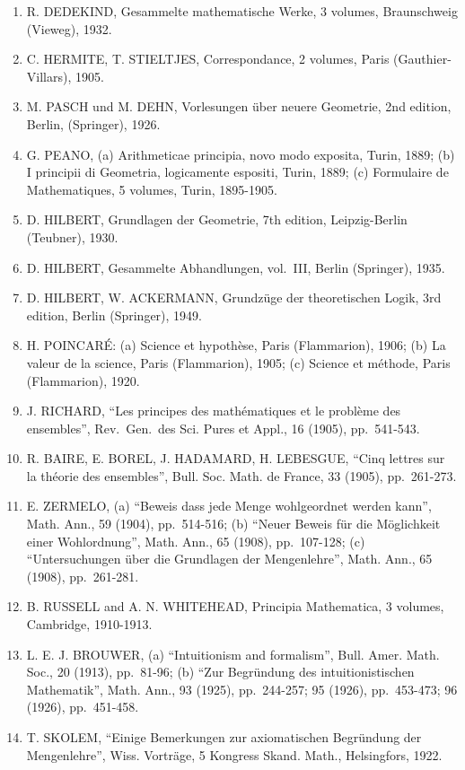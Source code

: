 \begin{enumerate}
\def\labelenumi{\arabic{enumi}.}
\setcounter{enumi}{25}
\item
  R. DEDEKIND, Gesammelte mathematische Werke, 3 volumes, Braunschweig (Vieweg), 1932.
\item
  C. HERMITE, T. STIELTJES, Correspondance, 2 volumes, Paris (Gauthier-Villars), 1905.
\item
  M. PASCH und M. DEHN, Vorlesungen über neuere Geometrie, 2nd edition, Berlin, (Springer), 1926.
\item
  G. PEANO, (a) Arithmeticae principia, novo modo exposita, Turin, 1889; (b) I principii di Geometria, logicamente espositi, Turin, 1889; (c) Formulaire de Mathematiques, 5 volumes, Turin, 1895-1905.
\item
  D. HILBERT, Grundlagen der Geometrie, 7th edition, Leipzig-Berlin (Teubner), 1930.
\item
  D. HILBERT, Gesammelte Abhandlungen, vol.~III, Berlin (Springer), 1935.
\item
  D. HILBERT, W. ACKERMANN, Grundzüge der theoretischen Logik, 3rd edition, Berlin (Springer), 1949.
\item
  H. POINCARÉ: (a) Science et hypothèse, Paris (Flammarion), 1906; (b) La valeur de la science, Paris (Flammarion), 1905; (c) Science et méthode, Paris (Flammarion), 1920.
\item
  J. RICHARD, ``Les principes des mathématiques et le problème des ensembles'', Rev.~Gen.~des Sci. Pures et Appl., 16 (1905), pp.~541-543.
\item
  R. BAIRE, E. BOREL, J. HADAMARD, H. LEBESGUE, ``Cinq lettres sur la théorie des ensembles'', Bull. Soc. Math. de France, 33 (1905), pp.~261-273.
\item
  E. ZERMELO, (a) ``Beweis dass jede Menge wohlgeordnet werden kann'', Math. Ann., 59 (1904), pp.~514-516; (b) ``Neuer Beweis für die Möglichkeit einer Wohlordnung'', Math. Ann., 65 (1908), pp.~107-128; (c) ``Untersuchungen über die Grundlagen der Mengenlehre'', Math. Ann., 65 (1908), pp.~261-281.
\item
  B. RUSSELL and A. N. WHITEHEAD, Principia Mathematica, 3 volumes, Cambridge, 1910-1913.
\item
  L. E. J. BROUWER, (a) ``Intuitionism and formalism'', Bull. Amer. Math. Soc., 20 (1913), pp.~81-96; (b) ``Zur Begründung des intuitionistischen Mathematik'', Math. Ann., 93 (1925), pp.~244-257; 95 (1926), pp.~453-473; 96 (1926), pp.~451-458.
\item
  T. SKOLEM, ``Einige Bemerkungen zur axiomatischen Begründung der Mengenlehre'', Wiss. Vorträge, 5 Kongress Skand. Math., Helsingfors, 1922.

\end{enumerate}
